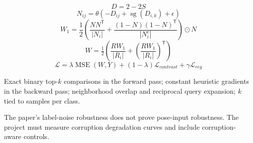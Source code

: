 \documentclass[11pt,oneside,openany]{book}
\theoremstyle{myplain}
\theoremstyle{definition}
\newcommand{\sg}{\operatorname{sg}}
\newcommand{\card}[1]{\left|#1\right|}
\newcommand{\transpose}{\mathsf{T}}
\newcommand{\had}{\odot}
\begin{document}
\begin{tcolorbox}[enhanced,breakable,colback=sky,colframe=teal,title=Five equations,fonttitle=\bfseries]
\[
D=2-2S
\]
\[
N_{ij}=\theta(-D_{ij}+\sg(D_{i,k})+\epsilon)
\]
\[
W_1=\frac12\left(\frac{NN^\transpose}{\card{N_i}}+
\frac{(1-N)(1-N)^\transpose}{\card{N_i^c}}\right)\had N
\]
\[
W=\tfrac12\left(\frac{RW_1}{\card{R_i}}+
\left(\frac{RW_1}{\card{R_i}}\right)^\transpose\right)
\]
\[
\mathcal L=\lambda\operatorname{MSE}(W,Y)+(1-\lambda)\mathcal L_{contrast}+\gamma\mathcal L_{reg}
\]
\end{tcolorbox}

\begin{tcolorbox}[enhanced,breakable,colback=amber,colframe=gold,title=What makes the method non-standard,fonttitle=\bfseries]
Exact binary top-$k$ comparisons in the forward pass; constant heuristic gradients in the backward pass; neighborhood overlap and reciprocal query expansion; $k$ tied to samples per class.
\end{tcolorbox}

\begin{tcolorbox}[enhanced,breakable,colback=rose,colframe=brick,title=What remains unknown,fonttitle=\bfseries]
The paper's label-noise robustness does not prove pose-input robustness. The project must measure corruption degradation curves and include corruption-aware controls.
\end{tcolorbox}

\backmatter
\end{document}
